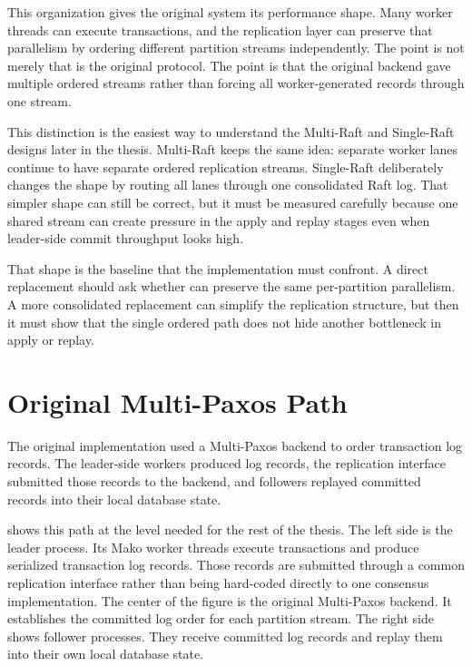 This organization gives the original system its performance shape. Many worker
threads can execute transactions, and the replication layer can preserve that
parallelism by ordering different partition streams independently. The point is
not merely that \Paxos{} is the original protocol. The point is that the
original backend gave \Mako{} multiple ordered streams rather than forcing all
worker-generated records through one stream.

This distinction is the easiest way to understand the Multi-Raft and
Single-Raft designs later in the thesis. Multi-Raft keeps the same idea:
separate worker lanes continue to have separate ordered replication streams.
Single-Raft deliberately changes the shape by routing all lanes through one
consolidated Raft log. That simpler shape can still be correct, but it must be
measured carefully because one shared stream can create pressure in the apply
and replay stages even when leader-side commit throughput looks high.

That shape is the baseline that the \Raft{} implementation must confront. A
direct replacement should ask whether \Raft{} can preserve the same
per-partition parallelism. A more consolidated replacement can simplify the
replication structure, but then it must show that the single ordered path does
not hide another bottleneck in apply or replay.

\section{Original Multi-Paxos Path}

The original \Mako{} implementation used a Multi-Paxos backend to order
transaction log records. The leader-side workers produced log records, the
replication interface submitted those records to the \Paxos{} backend, and
followers replayed committed records into their local database state.

 shows this path at the level needed for
the rest of the thesis. The left side is the leader process. Its Mako worker
threads execute transactions and produce serialized transaction log records.
Those records are submitted through a common replication interface rather than
being hard-coded directly to one consensus implementation. The center of the
figure is the original Multi-Paxos backend. It establishes the committed log
order for each partition stream. The right side shows follower processes. They
receive committed log records and replay them into their own local database
state.

